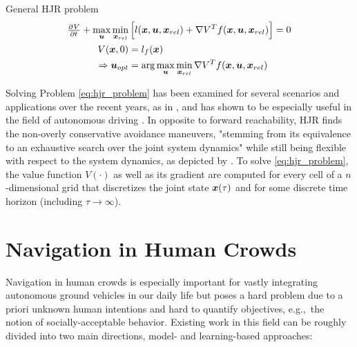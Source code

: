 \begin{problem}{General \ac{HJR} problem}
\begin{align}
\pd{V}{t} + \max_{\u}  \min_{\d} &\left[l(\x, \u, \d) + \nabla V^T f(\x, \u, \d) \right] = 0 \\ 
V(\x, 0) &= l_f(\x) \\
\Rightarrow \u_{opt} &= \arg \max_{\u}  \min_{\d} \nabla V^T f(\x, \u, \d)
\label{eq:hjr_problem_u}
\end{align}
\label{eq:hjr_problem}
\end{problem}

Solving Problem \ref{eq:hjr_problem} has been examined for several scenarios and applications over the recent years, as in \cite{Dhinakaran2017}\cite{Margellos2009}\cite{Chen2017b}, and has shown to be especially useful in the field of autonomous driving \cite{Althoff2009}\cite{Althoff2014}\cite{Althoff2010}. In opposite to forward reachability, \ac{HJR} finds the non-overly conservative avoidance maneuvers, "stemming from its equivalence to an exhaustive search over the joint system dynamics" while still being flexible with respect to the system dynamics, as depicted by \cite{Leung2020}. To solve \ref{eq:hjr_problem}, the value function $V(\cdot)$ as well as its gradient are computed for every cell of a $n$-dimensional grid that discretizes the joint state $\boldsymbol{x}(\tau)$ and for some discrete time horizon (including $\tau \rightarrow \infty$). 

\section{Navigation in Human Crowds}
\label{text:related/crowd_navigation}
Navigation in human crowds is especially important for vastly integrating autonomous ground vehicles in our daily life but poses a hard problem due to a priori unknown human intentions and hard to quantify objectives, e.g.,\ the notion of socially-acceptable behavior. Existing work in this field can be roughly divided into two main directions, model- and learning-based approaches: 

